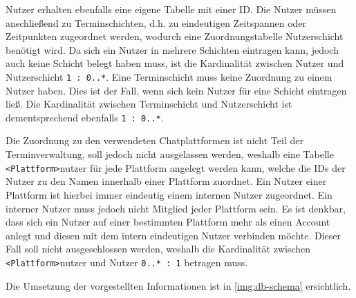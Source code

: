 Nutzer erhalten ebenfalls eine eigene Tabelle mit einer ID. Die Nutzer müssen anschließend zu Terminschichten, d.h. zu eindeutigen Zeitspannen oder Zeitpunkten zugeordnet werden, wodurch eine Zuordnungstabelle Nutzerschicht benötigt wird. Da sich ein Nutzer in mehrere Schichten eintragen kann, jedoch auch keine Schicht belegt haben muss, ist die Kardinalität zwischen Nutzer und Nutzerschicht \texttt{1 : 0..*}. Eine Terminschicht muss keine Zuordnung zu einem Nutzer haben. Dies ist der Fall, wenn sich kein Nutzer für eine Schicht eintragen ließ. Die Kardinalität zwischen Terminschicht und Nutzerschicht ist dementsprechend ebenfalls \texttt{1 : 0..*}.

Die Zuordnung zu den verwendeten Chatplattformen ist nicht Teil der Terminverwaltung, soll jedoch nicht ausgelassen werden, weshalb eine Tabelle \texttt{<Plattform>}nutzer für jede Plattform angelegt werden kann, welche die IDs der Nutzer zu den Namen innerhalb einer Plattform zuordnet. Ein Nutzer einer Plattform ist hierbei immer eindeutig einem internen Nutzer zugeordnet. Ein interner Nutzer muss jedoch nicht Mitglied jeder Plattform sein. Es ist denkbar, dass sich ein Nutzer auf einer bestimmten Plattform mehr als einen Account anlegt und diesen mit dem intern eindeutigen Nutzer verbinden möchte. Dieser Fall soll nicht ausgeschlossen werden, weshalb die Kardinalität zwischen \texttt{<Plattform>}nutzer und Nutzer \texttt{0..* : 1} betragen muss.

Die Umsetzung der vorgestellten Informationen ist in \autoref{img:db-schema} ersichtlich.



